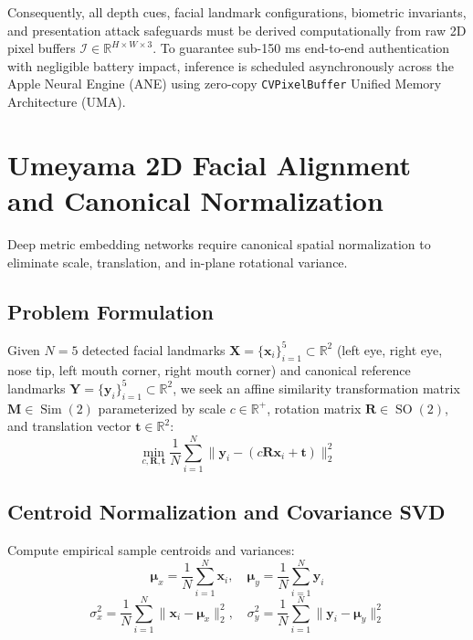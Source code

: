 \documentclass[11pt,a4paper]{article}
\begin{document}
Consequently, all depth cues, facial landmark configurations, biometric invariants, and presentation attack safeguards must be derived computationally from raw 2D pixel buffers $\mathcal{I} \in \mathbb{R}^{H \times W \times 3}$. To guarantee sub-150 ms end-to-end authentication with negligible battery impact, inference is scheduled asynchronously across the Apple Neural Engine (ANE) using zero-copy \texttt{CVPixelBuffer} Unified Memory Architecture (UMA).

\section{Umeyama 2D Facial Alignment and Canonical Normalization}

Deep metric embedding networks require canonical spatial normalization to eliminate scale, translation, and in-plane rotational variance.

\subsection{Problem Formulation}
Given $N=5$ detected facial landmarks $\mathbf{X} = \{\mathbf{x}_i\}_{i=1}^5 \subset \mathbb{R}^2$ (left eye, right eye, nose tip, left mouth corner, right mouth corner) and canonical reference landmarks $\mathbf{Y} = \{\mathbf{y}_i\}_{i=1}^5 \subset \mathbb{R}^2$, we seek an affine similarity transformation matrix $\mathbf{M} \in \operatorname{Sim}(2)$ parameterized by scale $c \in \mathbb{R}^+$, rotation matrix $\mathbf{R} \in \operatorname{SO}(2)$, and translation vector $\mathbf{t} \in \mathbb{R}^2$:
\begin{equation}
\min_{c, \mathbf{R}, \mathbf{t}} \frac{1}{N} \sum_{i=1}^N \|\mathbf{y}_i - (c \mathbf{R} \mathbf{x}_i + \mathbf{t})\|_2^2
\end{equation}

\subsection{Centroid Normalization and Covariance SVD}
Compute empirical sample centroids and variances:
\begin{equation}
\bm{\mu}_x = \frac{1}{N} \sum_{i=1}^N \mathbf{x}_i, \quad \bm{\mu}_y = \frac{1}{N} \sum_{i=1}^N \mathbf{y}_i
\end{equation}
\begin{equation}
\sigma_x^2 = \frac{1}{N} \sum_{i=1}^N \|\mathbf{x}_i - \bm{\mu}_x\|_2^2, \quad \sigma_y^2 = \frac{1}{N} \sum_{i=1}^N \|\mathbf{y}_i - \bm{\mu}_y\|_2^2
\end{equation}
\end{document}
